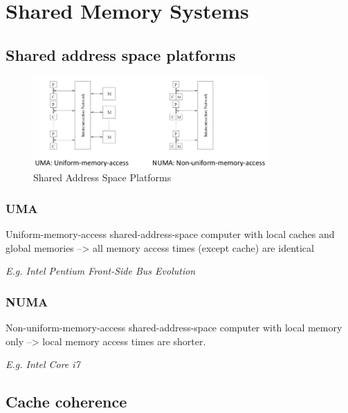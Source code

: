 \hypertarget{shared-memory-systems}{%
\section{Shared Memory Systems}\label{shared-memory-systems}}

\hypertarget{shared-address-space-platforms}{%
\subsection{Shared address space
platforms}\label{shared-address-space-platforms}}

\begin{figure}[H]
\centering
\includegraphics[width=0.8\textwidth]{figures/shared-address-space-platforms.png}
\caption{Shared Address Space Platforms}
\end{figure}

\hypertarget{uma}{%
\subsubsection{UMA}\label{uma}}

Uniform-memory-access shared-address-space computer with local caches
and global memories --\textgreater{} all memory access times (except
cache) are identical

\textit{E.g. Intel Pentium Front-Side Bus Evolution}

\hypertarget{numa}{%
\subsubsection{NUMA}\label{numa}}

Non-uniform-memory-access shared-address-space computer with local
memory only --\textgreater{} local memory access times are shorter.

\textit{E.g. Intel Core i7}

\hypertarget{cache-coherence}{%
\subsection{Cache coherence}\label{cache-coherence}}

